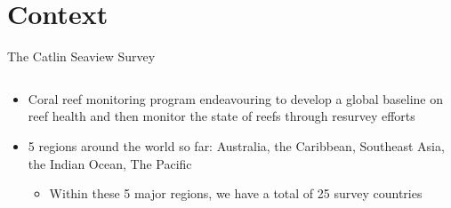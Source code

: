 \documentclass{beamer}
\begin{document}
    \section{Context}
        \begin{frame}{The Catlin Seaview Survey}
          \begin{columns}[T]
            \begin{column}{0.45\textwidth}
              \begin{itemize}
                \item Coral reef monitoring program endeavouring to develop a global baseline on reef health and then monitor the state of reefs through resurvey efforts
                \item 5 regions around the world so far: Australia, the Caribbean, Southeast Asia, the Indian Ocean, The Pacific
                  \begin{itemize}
                    \item Within these 5 major regions, we have a total of 25 survey countries
                  \end{itemize}
              \end{itemize}
            \end{column}


\end{columns}
\end{frame}
\end{document}
